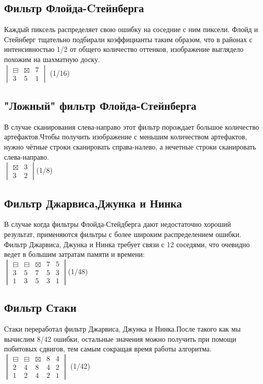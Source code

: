   \subsection{Фильтр Флойда-Cтейнберга }
  Каждый пиксель распределяет свою ошибку на соседние с ним пиксели. Флойд и Стейнберг тщательно  подбирали коэффицианты таким образом, что в районах с  интенсивностью 1/2 от общего количество оттенков, изображение выглядело похожим на шахматную доску.\\
$  \begin{vmatrix}
  	\boxminus & \boxtimes & 7\\
  	3 & 5 & 1
  \end{vmatrix}$ (1/16)
  \subsection{"Ложный"  фильтр Флойда-Стейнберга }
  В случае сканирования слева-направо этот фильтр порождает большое количество артефактов.Чтобы получить изображение с меньшим количеством артефактов, нужно чётные строки сканировать справа-налево, а нечетные строки сканировать слева-направо.\\
  $\begin{vmatrix}
  \boxtimes & 3 \\
  3 & 2 
  \end{vmatrix} $(1/8)
  
  \subsection{Фильтр Джарвиса,Джунка и Нинка}
    В случае когда фильтры Флойда-Стейдберга дают недостаточно хороший результат, применяются фильтры с более широким распределением ошибки. Фильтр Джарвиса, Джунка и Нинка требует связи с 12 соседями, что очевидно ведет в большим затратам памяти и времени\cite{Dh}:\\
    $\begin{vmatrix}
    \boxminus & \boxminus & \boxtimes & 7 & 5\\
    3 & 5 & 7 & 5 &3 \\
    1 & 3 & 5 & 3 & 1 
    \end{vmatrix}$(1/48)

  \subsection{Фильтр Стаки}
  Стаки переработал фильтр Джарвиса, Джунка и Нинка.После такого как мы вычислим 8/42 ошибки, остальные значения можно получить при помощи побитовых сдвигов, тем самым сокращая время работы алгоритма.\\
  $\begin{vmatrix}
  \boxminus & \boxminus & \boxtimes & 8 & 4 \\
  2 & 4 & 8 & 4 & 2 \\
  1 & 2 & 4 & 2 & 1
  
  \end{vmatrix}$ (1/42)
  
